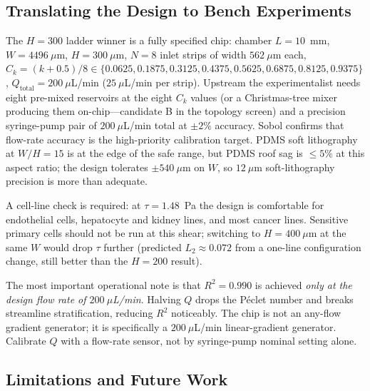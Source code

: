 \documentclass[12pt]{article}
\begin{document}
\subsection{Translating the Design to Bench Experiments}
The $H = 300$ ladder winner is a fully specified chip: chamber $L = 10$~mm, $W = 4496~\mu$m, $H = 300~\mu$m, $N = 8$ inlet strips of width $562~\mu$m each, $C_k = (k + 0.5)/8 \in \{0.0625, 0.1875, 0.3125, 0.4375, 0.5625, 0.6875, 0.8125, 0.9375\}$, $Q_{\text{total}} = 200~\mu$L/min ($25~\mu$L/min per strip). Upstream the experimentalist needs eight pre-mixed reservoirs at the eight $C_k$ values (or a Christmas-tree mixer producing them on-chip---candidate B in the topology screen) and a precision syringe-pump pair of $200~\mu$L/min total at $\pm 2\%$ accuracy. Sobol confirms that flow-rate accuracy is the high-priority calibration target. PDMS soft lithography at $W/H = 15$ is at the edge of the safe range, but PDMS roof sag is $\leq 5\%$ at this aspect ratio; the design tolerates $\pm 540~\mu$m on $W$, so $12~\mu$m soft-lithography precision is more than adequate.

A cell-line check is required: at $\tau = 1.48$~Pa the design is comfortable for endothelial cells, hepatocyte and kidney lines, and most cancer lines. Sensitive primary cells should not be run at this shear; switching to $H = 400~\mu$m at the same $W$ would drop $\tau$ further (predicted $L_2 \approx 0.072$ from a one-line configuration change, still better than the $H = 200$ result).

The most important operational note is that $R^2 = 0.990$ is achieved \emph{only at the design flow rate of $200~\mu$L/min}. Halving $Q$ drops the P\'eclet number and breaks streamline stratification, reducing $R^2$ noticeably. The chip is not an any-flow gradient generator; it is specifically a $200~\mu$L/min linear-gradient generator. Calibrate $Q$ with a flow-rate sensor, not by syringe-pump nominal setting alone.

\subsection{Limitations and Future Work}
\label{sec:limits_future}
\end{document}
